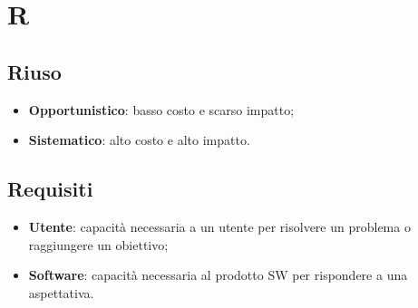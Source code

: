 \section{R}

    \subsection{Riuso}
    \label{glossario:riuso}
    \begin{itemize}
        \item \textbf{Opportunistico}: basso costo e scarso impatto;
        \item \textbf{Sistematico}: alto costo e alto impatto.
    \end{itemize}

    \subsection{Requisiti}
    \label{glossario:requisiti}
    \begin{itemize}
        \item \textbf{Utente}: capacità necessaria a un utente per risolvere un problema o raggiungere un obiettivo;
        \item \textbf{Software}: capacità necessaria al prodotto SW per rispondere a una aspettativa.
    \end{itemize}

\pagebreak